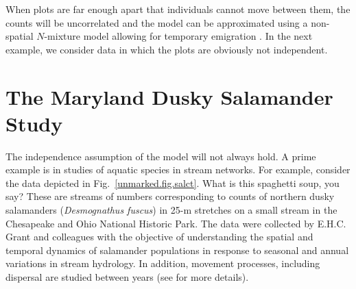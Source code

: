 When plots are far enough apart that
individuals cannot move between them, the counts will be uncorrelated
and the model can be approximated using a non-spatial $N$-mixture model
allowing for temporary emigration \citep{chandler_etal:2011}.
In the next example, we consider data in which the plots are obviously
not independent.


\section{The Maryland Dusky Salamander Study}
The independence assumption of the \citet{chandler_etal:2011} model
will not always hold. A prime example is in studies of aquatic
species in stream networks. For example, consider the data depicted in
Fig.~\ref{unmarked.fig.salct}. What is this spaghetti soup, you say? 
These
are streams of numbers corresponding to counts of northern dusky salamanders
(\textit{Desmognathus fuscus}) in 25-m stretches on a small stream in the Chesapeake and
Ohio National Historic Park. The data were collected by E.H.C. Grant
and colleagues with the objective of understanding the spatial and
temporal dynamics of salamander populations in response to seasonal
and annual variations in stream
hydrology. In addition, movement processes, including dispersal are
studied between years (see \citet{grant_etal:2010} for more
details).

